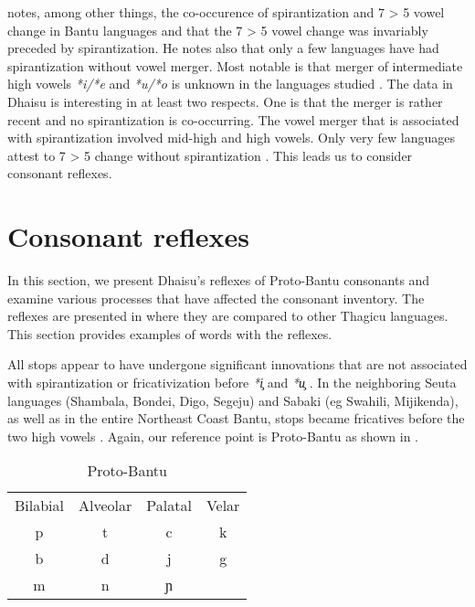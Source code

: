 \documentclass[output=paper,colorlinks,citecolor=brown]{langscibook}
\begin{document}
\cite{Schadeberg1995} notes, among other things, the co-occurence of spirantization and 7 > 5 vowel change in Bantu languages and that the 7 > 5 vowel change was invariably preceded by spirantization. He notes also that only a few languages have had spirantization without vowel merger. Most notable is that merger of intermediate high vowels \textit{*i/*e} and \textit{*u/*o} is unknown in the languages studied \citep{Schadeberg1995}. The data in Dhaisu is interesting in at least two respects. One is that the merger is rather recent and no spirantization is co-occurring. The vowel merger that is associated with spirantization involved mid-high and high vowels. Only very few languages attest to 7 > 5 change without spirantization \citep{Bostoen2008}. This leads us to consider consonant reflexes.

\section{Consonant reflexes}\label{sec:ngonyani:5}

In this section, we present Dhaisu's reflexes of Proto-Bantu consonants and examine various processes that have affected the consonant inventory. The reflexes are presented in \citet[204]{Nurse1982} where they are compared to other Thagicu languages. This section provides examples of words with the reflexes. 

All stops  appear to have undergone significant innovations that are not associated with spirantization or fricativization before \textit{*i̧ }and \textit{*u̧} \citep{Nurse1982,Nurse2000}. In the neighboring Seuta languages (Shambala, Bondei, Digo, Segeju) and Sabaki (eg Swahili, Mijikenda), as well as in the entire Northeast Coast Bantu, stops became fricatives before the two high vowels \citep{NurseHinnebusch1993}. Again, our reference point is Proto-Bantu as shown in . 

\begin{table}
	\caption{Proto-Bantu \cite[83]{Meeussen1967}}
	\label{tab:ngonyani:17}
    \begin{tabular}{@{}c c c c@{}}
    	Bilabial & Alveolar & Palatal & Velar\\
    	p & t & c & k\\
    	b & d & j & g\\
    	m & n & ɲ &   \\
    \end{tabular}
\end{table}
\end{document}
